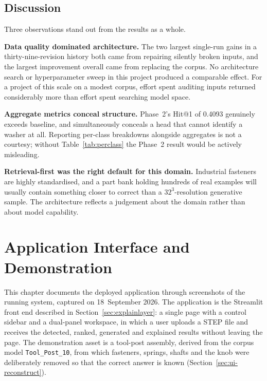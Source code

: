 \documentclass[12pt,oneside,a4paper]{report}
\begin{document}
\section{Discussion}

Three observations stand out from the results as a whole.

\textbf{Data quality dominated architecture.} The two largest single-run
gains in a thirty-nine-revision history both came from repairing silently
broken inputs, and the largest improvement overall came from replacing the
corpus. No architecture search or hyperparameter sweep in this project
produced a comparable effect. For a project of this scale on a modest corpus,
effort spent auditing inputs returned considerably more than effort spent
searching model space.

\textbf{Aggregate metrics conceal structure.} Phase~2's Hit@1 of 0.4093
genuinely exceeds baseline, and simultaneously conceals a head that cannot
identify a washer at all. Reporting per-class breakdowns alongside aggregates
is not a courtesy; without Table~\ref{tab:perclass} the Phase~2 result would
be actively misleading.

\textbf{Retrieval-first was the right default for this domain.} Industrial
fasteners are highly standardised, and a part bank holding hundreds of real
examples will usually contain something closer to correct than a
$32^3$-resolution generative sample. The architecture reflects a judgement
about the domain rather than about model capability.

\chapter{Application Interface and Demonstration}
\label{ch:ui}

This chapter documents the deployed application through screenshots of the
running system, captured on 18~September 2026. The application is the
Streamlit front end described in Section~\ref{sec:explainlayer}: a single
page with a control sidebar and a dual-panel workspace, in which a user
uploads a STEP file and receives the detected, ranked, generated and explained
results without leaving the page. The demonstration asset is a tool-post
assembly, derived from the corpus model \texttt{Tool\_Post\_10}, from which
fasteners, springs, shafts and the knob were deliberately removed so that the
correct answer is known (Section~\ref{sec:ui-reconstruct}).
\end{document}
